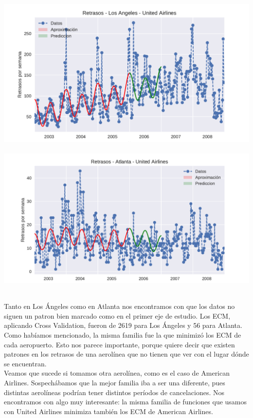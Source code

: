{\centering
  \includegraphics[width=1.0\linewidth]{informe/imagenes/retrasosUnitedAirlinesLAvol3.pdf}
}
$ $\newline
{\centering
  \includegraphics[width=1.0\linewidth]{informe/imagenes/retrasosUnitedAirlinesATLvol3.pdf}
}
$ $\newline

Tanto en Los Ángeles como en Atlanta nos encontramos con que los datos no siguen un patron bien marcado como en el primer eje de estudio. Los ECM, aplicando Cross Validation, fueron de 2619 para Los Ángeles y 56 para Atlanta.
Como habíamos mencionado, la misma familia fue la que minimizó los ECM de cada aeropuerto. Esto nos parece importante, porque quiere decir que existen patrones en los retrasos de una aerolínea que no tienen que ver con el lugar dónde se encuentran. \\

Veamos que sucede si tomamos otra aerolínea, como es el caso de American Airlines. Sospechábamos que la mejor familia iba a ser una diferente, pues distintas aerolíneas podrían tener distintos períodos de cancelaciones. Nos encontramos con algo muy interesante: la misma familia de funciones que usamos con United Airlines minimiza también los ECM de American Airlines. \\

